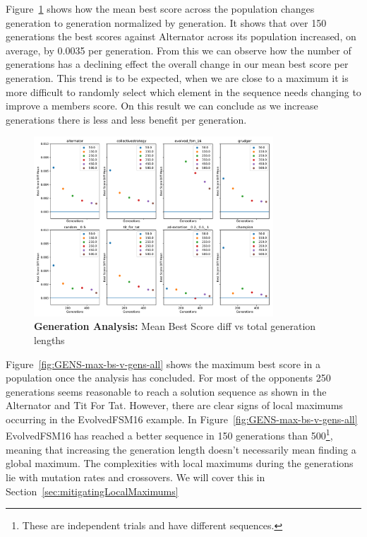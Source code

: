 Figure~\ref{fig:GENS-mean-bs-diff-v-gens-all} shows how the mean best score across the population changes generation to generation normalized by generation.
It shows that over 150 generations the best scores against Alternator across its population increased, on average, by 0.0035 per generation.
From this we can observe how the number of generations has a declining effect the overall change in our mean best score per generation.
This trend is to be expected, when we are close to a maximum it is more difficult to randomly select which element in the sequence needs changing to improve a members score.
On this result we can conclude as we increase generations there is less and less benefit per generation.

\begin{figure}[h]
    \includegraphics[width=0.8\textwidth, keepaspectratio, center]{./img/plots/GENS_mean_bs_diff_v_gens_all.pdf}
    \caption{\textbf{Generation Analysis:} Mean Best Score diff vs total generation lengths}\label{fig:GENS-mean-bs-diff-v-gens-all}
\end{figure}

Figure~\ref{fig:GENS-max-bs-v-gens-all} shows the maximum best score in a population once the analysis has concluded.
For most of the opponents 250 generations seems reasonable to reach a solution sequence as shown in the Alternator and Tit For Tat.
However, there are clear signs of local maximums occurring in the EvolvedFSM16 example.
In Figure~\ref{fig:GENS-max-bs-v-gens-all} EvolvedFSM16 has reached a better sequence in 150 generations than 500\footnote{These are independent trials and have different sequences.}, meaning that increasing the generation length doesn't necessarily mean finding a global maximum.
The complexities with local maximums during the generations lie with mutation rates and crossovers.
We will cover this in Section~\ref{sec:mitigatingLocalMaximums}

